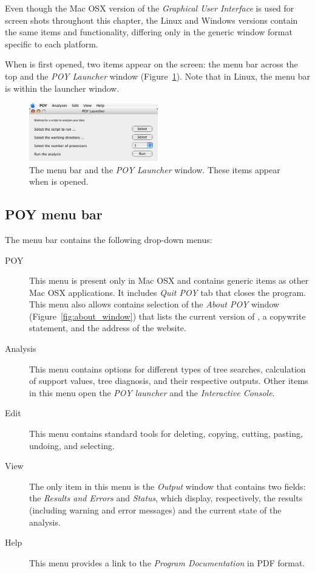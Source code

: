 Even though the Mac OSX version of the \emph{Graphical User Interface} is used for screen shots throughout this chapter, the Linux and Windows versions contain the same items and functionality, differing only in the generic window format specific to each platform.

When \poy is first opened, two items appear on the screen: the menu bar across the top and the \emph{POY Launcher} window (Figure~\ref{fig:menu_launcher_window}). Note that in Linux, the menu bar is within the launcher window.
\begin{figure}[htpb]
    \begin{center}
        \includegraphics[width=0.5\textwidth]{figures/menu_launcher_window.jpg}
    \end{center}
    \caption{The \poy menu bar and the \emph{POY Launcher} window. These items appear when \poy is opened.}
    \label{fig:menu_launcher_window}
\end{figure}

\subsection{POY menu bar}
The menu bar contains the following drop-down menus:
\begin{description}
\item[POY] This menu is present only in Mac OSX and contains generic items as other Mac OSX applications. It includes \emph{Quit POY} tab that closes the program. This menu also allows contains selection of the \emph{About POY} window (Figure~\ref{fig:about_window}) that lists the current version of \poy, a copywrite statement, and the address of the \poy website.
\item[Analysis] This menu contains options for different types of tree searches, calculation of support values, tree diagnosis, and their respective outputs. Other items in this menu open the \emph{POY launcher} and the \emph{Interactive Console}.
\item[Edit] This menu contains standard tools for deleting, copying, cutting, pasting, undoing, and selecting.
\item[View] The only item in this menu is the \emph{Output} window that contains two fields: the \emph{Results and Errors} and \emph{Status}, which display, respectively, the results (including warning and error messages) and the current state of the analysis.
\item[Help] This menu provides a link to the \poy \emph{Program Documentation} in PDF format.
\end{description}

